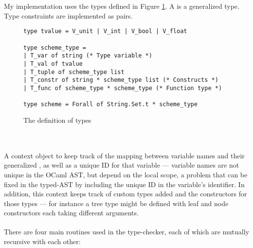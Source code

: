\\\\
My implementation uses the types defined in Figure \ref{fig:types}. A  is a generalized type. Type constraints are implemented as  pairs.
\begin{figure}[h]
\begin{verbatim}
type tvalue = V_unit | V_int | V_bool | V_float

type scheme_type =
| T_var of string (* Type variable *)
| T_val of tvalue
| T_tuple of scheme_type list
| T_constr of string * scheme_type list (* Constructs *)
| T_func of scheme_type * scheme_type (* Function type *)

type scheme = Forall of String.Set.t * scheme_type
\end{verbatim}
\caption{The definition of types}
\label{fig:types}
\end{figure}
\\\\
A context object to keep track of the mapping between variable names and their generalized , as well as a unique ID for that variable --- variable names are not unique in the OCaml AST, but depend on the local scope, a problem that can be fixed in the typed-AST by including the unique ID in the variable's identifier. In addition, this context keeps track of custom types added and the constructors for those types --- for instance a tree type might be defined with leaf and node constructors each taking different arguments.
\\\\
There are four main routines used in the type-checker, each of which are mutually recursive with each other:
